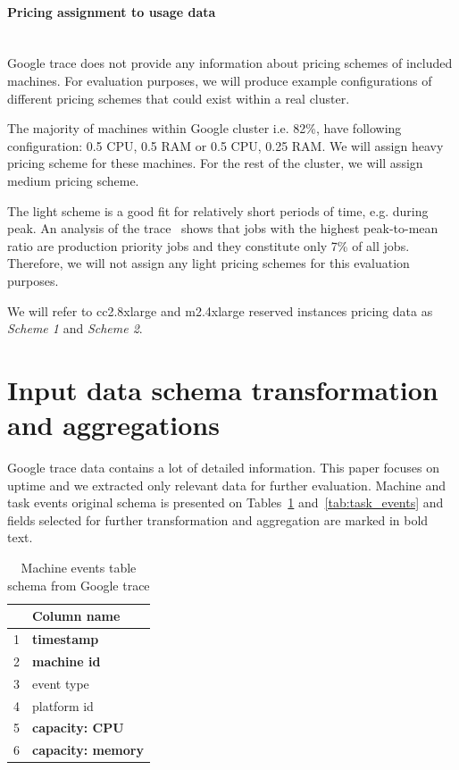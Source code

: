 \documentclass[]{final_report}
\newcommand{\myparagraph}[1]{\paragraph{#1}\mbox{}\\}
\begin{document}
\myparagraph{Pricing assignment to usage data}

Google trace does not provide any information about pricing schemes of included machines. For evaluation purposes, we will produce example configurations of different pricing schemes that could exist within a real cluster. 

The majority of machines within Google cluster i.e. 82\%, have following configuration: 0.5 CPU, 0.5 RAM or 0.5 CPU, 0.25 RAM. We will assign heavy pricing scheme for these machines. For the rest of the cluster, we will assign medium pricing scheme. 

The light scheme is a good fit for relatively short periods of time, e.g. during peak. An analysis of the trace~\cite{clusterdata:Reiss2012b} shows that jobs with the highest peak-to-mean ratio are production priority jobs and they constitute only 7\% of all jobs. Therefore, we will not assign any light pricing schemes for this evaluation purposes. 

We will refer to cc2.8xlarge and m2.4xlarge reserved instances pricing data as \textit{Scheme 1} and \textit{Scheme 2}.  
 

\section{Input data schema transformation and aggregations}

Google trace data contains a lot of detailed information. This paper focuses on uptime and we extracted only relevant data for further evaluation. Machine and task events original schema is presented on Tables~\ref{tab:machine_events} and~\ref{tab:task_events} and fields selected for further transformation and aggregation are marked in bold text. 

\begin{table}[h]
\begin{center}
    \begin{tabular}{| l | l |}
    \hline
    & \textbf{Column name} \\
    \hline
    1 & \textbf{timestamp}\\
    \hline
    2 & \textbf{machine id} \\
     \hline
    3 & event type\\
     \hline
    4 & platform id\\
     \hline
    5 & \textbf{capacity: CPU}\\
     \hline
    6 & \textbf{capacity: memory}\\
    \hline
    \end{tabular}
\end{center}
\caption{Machine events table schema from Google trace}
\label{tab:machine_events}
\end{table}
\end{document}
